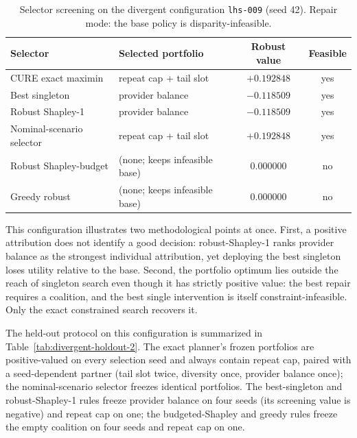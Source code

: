 \documentclass[pdflatex,sn-mathphys-num]{sn-jnl}
\theoremstyle{thmstyleone}
\theoremstyle{thmstyletwo}
\theoremstyle{thmstylethree}
\begin{document}
\begin{table}[t]
\caption{Selector screening on the divergent configuration \texttt{lhs-009} (seed 42). Repair mode: the base policy is disparity-infeasible.}\label{tab:divergent-screening-2}
\centering
\scriptsize
\setlength{\tabcolsep}{4pt}
\begin{tabular}{@{}llcc@{}}
\toprule
Selector & Selected portfolio & Robust value & Feasible\\
\midrule
CURE exact maximin & repeat cap + tail slot & $+0.192848$ & yes\\
Best singleton & provider balance & $-0.118509$ & yes\\
Robust Shapley-1 & provider balance & $-0.118509$ & yes\\
Nominal-scenario selector & repeat cap + tail slot & $+0.192848$ & yes\\
Robust Shapley-budget & (none; keeps infeasible base) & $0.000000$ & no\\
Greedy robust & (none; keeps infeasible base) & $0.000000$ & no\\
\bottomrule
\end{tabular}
\end{table}

This configuration illustrates two methodological points at once. First, a positive attribution does not identify a good decision: robust-Shapley-1 ranks provider balance as the strongest individual attribution, yet deploying the best singleton loses utility relative to the base. Second, the portfolio optimum lies outside the reach of singleton search even though it has strictly positive value: the best repair requires a coalition, and the best single intervention is itself constraint-infeasible. Only the exact constrained search recovers it.

The held-out protocol on this configuration is summarized in Table~\ref{tab:divergent-holdout-2}. The exact planner's frozen portfolios are positive-valued on every selection seed and always contain repeat cap, paired with a seed-dependent partner (tail slot twice, diversity once, provider balance once); the nominal-scenario selector freezes identical portfolios. The best-singleton and robust-Shapley-1 rules freeze provider balance on four seeds (its screening value is negative) and repeat cap on one; the budgeted-Shapley and greedy rules freeze the empty coalition on four seeds and repeat cap on one.
\end{document}
